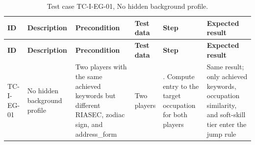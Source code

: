 {\footnotesize{}\renewcommand{\arraystretch}{1.1}
\begin{longtable}{|>{\raggedright\arraybackslash}p{}|>{\raggedright\arraybackslash}p{}|>{\raggedright\arraybackslash}p{}|>{\raggedright\arraybackslash}p{}|>{\raggedright\arraybackslash}p{}|>{\raggedright\arraybackslash}p{}|}
\caption{Test case TC-I-EG-01, No hidden background profile.} \\
\hline
\textbf{ID} & \textbf{Description} & \textbf{Precondition} & \textbf{Test data} & \textbf{Step} & \textbf{Expected result} \\ \hline
\endfirsthead
\hline
\textbf{ID} & \textbf{Description} & \textbf{Precondition} & \textbf{Test data} & \textbf{Step} & \textbf{Expected result} \\ \hline
\endhead
TC-I-EG-01 & No hidden background profile & Two players with the same achieved keywords but different RIASEC, zodiac sign, and address\_\allowbreak{}form & Two players & 1. Compute entry to the target occupation for both players & Same result; only achieved keywords, occupation similarity, and soft-skill tier enter the jump rule \\ \hline
\end{longtable}
}

